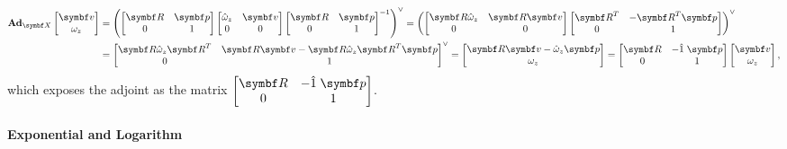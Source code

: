 \begin{equation}
  \begin{aligned}
    \bAd_{\X} \begin{bmatrix} \bv \\ \omega_{z} \end{bmatrix}
    & = \left( \begin{bmatrix} \bR & \bp \\ 0 & 1 \end{bmatrix}
    \begin{bmatrix}
      \hat \omega_{z} & \bv \\ 0 & 0
    \end{bmatrix}
    \begin{bmatrix} \bR & \bp \\ 0 & 1 \end{bmatrix}^{-1} \right)^{\vee}
    = \left( \begin{bmatrix} \bR \hat \omega_{z} & \bR \bv \\ 0 & 0 \end{bmatrix}
    \begin{bmatrix} \bR^{T} & -\bR^{T} \bp \\ 0 & 1 \end{bmatrix} \right)^{\vee} \\
    & = \begin{bmatrix} \bR \hat \omega_{z} \bR^{T} & \bR \bv - \bR \hat \omega_{z} \bR^{T} \bp \\ 0 & 1 \end{bmatrix}^{\vee}
    = \begin{bmatrix} \bR \bv - \hat \omega_{z} \bp \\ \omega_{z} \end{bmatrix} =
    \begin{bmatrix}
      \bR & -\hat 1 \; \bp
       \\ 0 & 1
    \end{bmatrix}
    \begin{bmatrix} \bv \\ \omega_{z} \end{bmatrix}
   ,
  \end{aligned}
\end{equation}
which exposes the adjoint as the matrix $\begin{bmatrix} \bR & -\hat 1 \; \bp \\ 0 & 1 \end{bmatrix}$.

\paragraph{Exponential and Logarithm}

